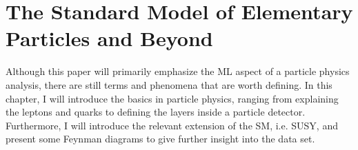 \chapter{The Standard Model of Elementary Particles and Beyond}
Although this paper will primarily emphasize the \ac{ML} aspect of a particle physics analysis, there are still terms and phenomena that are worth defining.
In this chapter, I will introduce the basics in particle physics, ranging from explaining the leptons and quarks to defining the layers inside a 
particle detector. Furthermore, I will introduce the relevant extension of the \ac{SM}, i.e. \ac{SUSY}, and present some Feynman diagrams 
to give further insight into the data set.